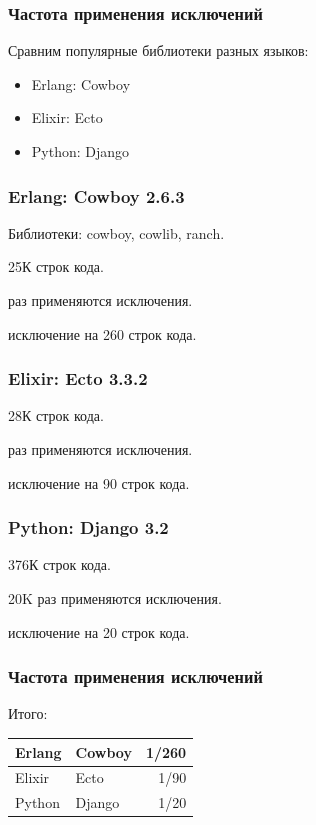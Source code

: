 \documentclass[10pt]{beamer}
\begin{document}
\begin{frame}
  \frametitle{Частота применения исключений}
  Сравним популярные библиотеки разных языков:
  \begin{itemize}
  \item Erlang: Cowboy
  \item Elixir: Ecto
  \item Python: Django
  \end{itemize}
\end{frame}

\begin{frame}
  \frametitle{Erlang: Cowboy 2.6.3}
  Библиотеки: cowboy, cowlib, ranch.
  \par \bigskip
  25К строк кода.
  \par {} раз применяются исключения.
  \par {} исключение на 260 строк кода.
\end{frame}

\begin{frame}
  \frametitle{Elixir: Ecto 3.3.2}
  28К строк кода.
  \par {} раз применяются исключения.
  \par {} исключение на 90 строк кода.
\end{frame}

\begin{frame}
  \frametitle{Python: Django 3.2}
  376К строк кода.
  \par \bigskip
  20K раз применяются исключения.
  \par {} исключение на 20 строк кода.
\end{frame}

\begin{frame}
  \frametitle{Частота применения исключений}
  \centering
  Итого:
  \par \bigskip
  \setlength{\tabcolsep}{2em}
  \begin{tabular}{| l | l | r |}
    \hline
    Erlang & Cowboy & 1/260 \\
    \hline
    Elixir & Ecto & 1/90 \\
    \hline
    Python & Django & 1/20 \\
    \hline
  \end{tabular}
\end{frame}
\end{document}
